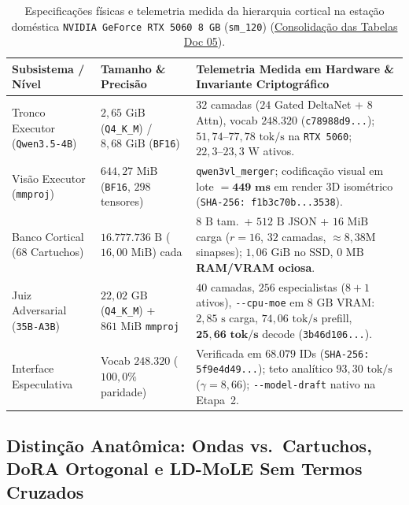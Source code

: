 \documentclass[10pt,a4paper]{article}
\begin{document}
\begin{table}[!htbp]
\centering
\caption{Especifica\c{c}\~oes f\'isicas e telemetria medida da hierarquia cortical na esta\c{c}\~ao dom\'estica \texttt{NVIDIA GeForce RTX 5060 8 GB} (\texttt{sm\_\allowbreak{}120}) (\href{https://docs.google.com/document/d/1SMqD_TRf6Qi8UwPTFYjKPNvdVlEtpCqr3Ex57x76FsI/edit?usp=drivesdk}{Consolida\c{c}\~ao das Tabelas Doc 05}).}
\label{tab:dualtier}
\footnotesize
\begin{tabularx}{\linewidth}{@{}llY@{}}
\toprule
\textbf{Subsistema / N\'ivel} & \textbf{Tamanho \& Precis\~ao} & \textbf{Telemetria Medida em Hardware \& Invariante Criptogr\'afico} \\
\midrule
Tronco Executor (\texttt{Qwen3.5-4B}) & $2,65\text{ GiB}$ (\texttt{Q4\_\allowbreak{}K\_\allowbreak{}M}) / $8,68\text{ GiB}$ (\texttt{BF16}) & $32$ camadas ($24$ Gated DeltaNet + $8$ Attn), vocab $248.320$ (\texttt{c78988d9...}); $51,74\text{--}77,78\text{ tok/s}$ na \texttt{RTX 5060}; $22,3\text{--}23,3\text{ W}$ ativos. \\
Vis\~ao Executor (\texttt{mmproj}) & $644,27\text{ MiB}$ (\texttt{BF16}, $298$ tensores) & \texttt{qwen3vl\_\allowbreak{}merger}; codifica\c{c}\~ao visual em lote $= \mathbf{449\text{ ms}}$ em render 3D isom\'etrico (\texttt{SHA-256: f1b3c70b...3538}). \\
Banco Cortical ($68$ Cartuchos) & $16.777.736\text{ B}$ ($16,00\text{ MiB}$) cada & $8\text{ B}$ tam.\ + $512\text{ B}$ JSON + $16\text{ MiB}$ carga ($r=16$, $32$ camadas, $\approx 8,38\text{M}$ sinapses); $1,06\text{ GiB}$ no SSD, \textbf{$0\text{ MB}$ RAM/VRAM ociosa}. \\
Juiz Adversarial (\texttt{35B-A3B}) & $22,02\text{ GB}$ (\texttt{Q4\_\allowbreak{}K\_\allowbreak{}M}) + $861\text{ MiB}$ \texttt{mmproj} & $40$ camadas, $256$ especialistas ($8+1$ ativos), \texttt{-{}-cpu-moe} em $8\text{ GB}$ VRAM: $2,85\text{ s}$ carga, $74,06\text{ tok/s}$ prefill, $\mathbf{25,66\text{ tok/s}}$ decode (\texttt{3b46d106...}). \\
Interface Especulativa & Vocab $248.320$ ($100,0\%$ paridade) & Verificada em $68.079$ IDs (\texttt{SHA-256: 5f9e4d49...}); teto anal\'itico $93,30\text{ tok/s}$ ($\gamma=8,66$); \texttt{-{}-model-draft} nativo na Etapa~2. \\
\bottomrule
\end{tabularx}
\end{table}

\subsection{Distin\c{c}\~ao Anat\^omica: Ondas vs.\ Cartuchos, DoRA Ortogonal e LD-MoLE Sem Termos Cruzados}
\end{document}
